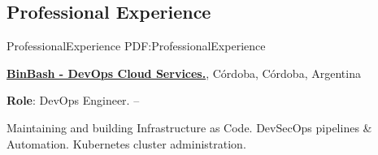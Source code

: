 \documentclass[letterpaper,MMMyyyy,nonstop]{simpleresumecv}
\begin{document}
\begin{body}

%
%


%
%


\section
{Professional \newline
	Experience}
{ProfessionalExperience}
{PDF:ProfessionalExperience}

\href{https://www.binbash.com.ar/}
{\textbf{BinBash - DevOps Cloud Services.}},
Córdoba, Córdoba, Argentina

\GapNoBreak
\BulletItem
\textbf{Role}: DevOps Engineer.
\hfill
{} --
\begin{detail}
	\SubBulletItem
	Maintaining and building Infrastructure as Code.
	\SubBulletItem
	DevSecOps pipelines \& Automation.
	\SubBulletItem
	Kubernetes cluster administration.
\end{detail}


\end{body}
\end{document}
